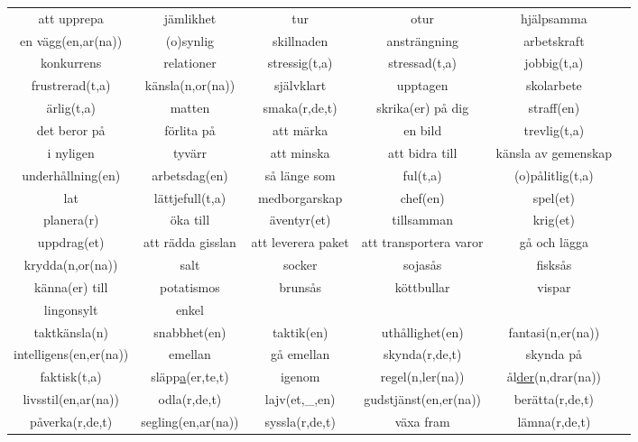 \begin{center}
    \begin{adjustwidth}{-2.2cm}{}
        \begin{tabular}{|c c c c c c|}
            \hline
            att upprepa & jämlikhet & tur & otur & hjälpsamma & \\
            en vägg(en,ar(na)) & (o)synlig & skillnaden & ansträngning & arbetskraft & \\
            konkurrens & relationer & stressig(t,a) & stressad(t,a) & jobbig(t,a) & \\
            frustrerad(t,a) & känsla(n,or(na)) & självklart & upptagen & skolarbete & \\
            ärlig(t,a) & matten & smaka(r,de,t) & skrika(er) på dig & straff(en) & \\
            det beror på & förlita på & att märka & en bild & trevlig(t,a) & \\
            i nyligen & tyvärr & att minska & att bidra till & känsla av gemenskap & \\
            underhållning(en) & arbetsdag(en) & så länge som & ful(t,a) & (o)pålitlig(t,a) & \\
            lat & lättjefull(t,a) & medborgarskap & chef(en) & spel(et) & \\
            planera(r) & öka till & äventyr(et) & tillsamman & krig(et) & \\
            uppdrag(et) & att rädda gisslan & att leverera paket & att transportera varor & gå och lägga & \\
            krydda(n,or(na)) & salt & socker & sojasås & fisksås & \\
            känna(er) till & potatismos & brunsås & köttbullar & vispar & \\
            lingonsylt & enkel &  &  &  & \\
            taktkänsla(n) & snabbhet(en) & taktik(en) & uthållighet(en) & fantasi(n,er(na)) & \\
            intelligens(en,er(na)) & emellan & gå emellan & skynda(r,de,t) & skynda på & \\
            faktisk(t,a) & släpp\underline{a}(er,te,t) & igenom & regel(n,ler(na)) & ål\underline{der}(n,drar(na)) & \\
            livsstil(en,ar(na)) & odla(r,de,t) & lajv(et,\_,en) & gudstjänst(en,er(na)) & berätta(r,de,t) & \\
            påverka(r,de,t) & segling(en,ar(na)) & syssla(r,de,t) & växa fram & lämna(r,de,t) & \\

\end{tabular}
\end{adjustwidth}
\end{center}

